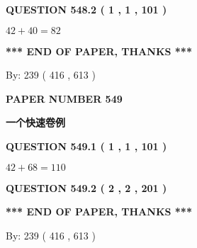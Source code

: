 \documentclass{ctexart}
\begin{document}
{\textbf{\Large{QUESTION
548.2 
 ( 1 , 1 , 101 )
}}}
  
  
 
 

$ %
42 +  %
40=   %
82$
 
 
   
   
 \vspace{0.2in}
 
   
   
   
   
\vspace{1.0in} 
{\textbf{\large{ *** END OF PAPER, THANKS *** }}} 
   
   
\hspace{1.0in} By: 
 239 ( 416 ,  613 )
   
   
   
   
\newpage 
\setcounter{page}{ 
   549001 } 
   
   
   
   
 {\textbf{ \Large{ PAPER NUMBER  549  }}}
   
   
\vspace{0.2in}
   
   
   
   
   
   
 \vspace{0.2in}
{\LARGE {\textbf{ 一个快速卷例}}}
   
   
  
\vspace{0.2in}
  
{\textbf{\Large{QUESTION
549.1 
 ( 1 , 1 , 101 )
}}}
  
  
 
 

$ %
42 +  %
68=   %
110$
 
 
  
\vspace{0.2in}
  
{\textbf{\Large{QUESTION
549.2 
 ( 2 , 2 , 201 )
}}}
  
  
   
   
 \vspace{0.2in}
 
   
   
   
   
\vspace{1.0in} 
{\textbf{\large{ *** END OF PAPER, THANKS *** }}} 
   
   
\hspace{1.0in} By: 
 239 ( 416 ,  613 )
   
\end{document}
